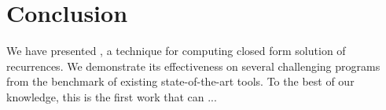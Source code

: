 \section{Conclusion}
\label{sec:conclu}
We have presented \SystemName, a technique for computing closed form solution of recurrences. 
We demonstrate its effectiveness on several  challenging programs
from the benchmark of existing state-of-the-art tools. 
To the best of our knowledge, this is the first work that can ...

%










 


